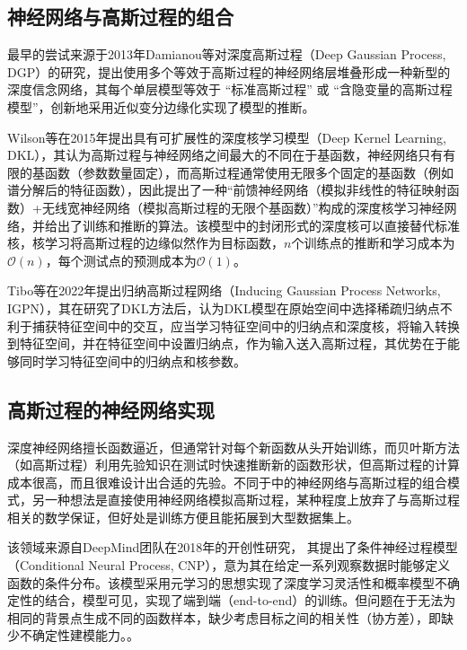 \documentclass[final]{cvpr}
\begin{document}
\subsection{\textbf{神经网络与高斯过程的组合}}
\label{sec:GP-NN:GP+NN}

最早的尝试来源于2013年Damianou等对深度高斯过程（Deep Gaussian Process, DGP）的研究，提出使用多个等效于高斯过程的神经网络层堆叠形成一种新型的深度信念网络，其每个单层模型等效于 “标准高斯过程” 或 “含隐变量的高斯过程模型”，创新地采用近似变分边缘化实现了模型的推断\cite{damianou2013deep}。

Wilson等在2015年提出具有可扩展性的深度核学习模型（Deep Kernel Learning, DKL），其认为高斯过程与神经网络之间最大的不同在于基函数，神经网络只有有限的基函数（参数数量固定），而高斯过程通常使用无限多个固定的基函数（例如谱分解后的特征函数），因此提出了一种“前馈神经网络（模拟非线性的特征映射函数）+无线宽神经网络（模拟高斯过程的无限个基函数）”构成的深度核学习神经网络，并给出了训练和推断的算法。该模型中的封闭形式的深度核可以直接替代标准核，核学习将高斯过程的边缘似然作为目标函数，$n$个训练点的推断和学习成本为$\mathcal{O}(n)$，每个测试点的预测成本为$\mathcal{O}(1)$\cite{wilson2016deep}。

Tibo等在2022年提出归纳高斯过程网络（Inducing Gaussian Process Networks, IGPN），其在研究了DKL方法后，认为DKL模型在原始空间中选择稀疏归纳点不利于捕获特征空间中的交互，应当学习特征空间中的归纳点和深度核，将输入转换到特征空间，并在特征空间中设置归纳点，作为输入送入高斯过程，其优势在于能够同时学习特征空间中的归纳点和核参数\cite{tibo2022inducing}。

\subsection{\textbf{高斯过程的神经网络实现}}
深度神经网络擅长函数逼近，但通常针对每个新函数从头开始训练，而贝叶斯方法（如高斯过程）利用先验知识在测试时快速推断新的函数形状，但高斯过程的计算成本很高，而且很难设计出合适的先验。不同于中的神经网络与高斯过程的组合模式，另一种想法是直接使用神经网络模拟高斯过程，某种程度上放弃了与高斯过程相关的数学保证，但好处是训练方便且能拓展到大型数据集上。

该领域来源自DeepMind团队在2018年的开创性研究，
其提出了条件神经过程模型（Conditional Neural Process, CNP），意为其在给定一系列观察数据时能够定义函数的条件分布。该模型采用元学习的思想实现了深度学习灵活性和概率模型不确定性的结合，模型可见，实现了端到端（end-to-end）的训练。但问题在于无法为相同的背景点生成不同的函数样本，缺少考虑目标之间的相关性（协方差），即缺少不确定性建模能力。\cite{garnelo2018conditional}。
\end{document}
